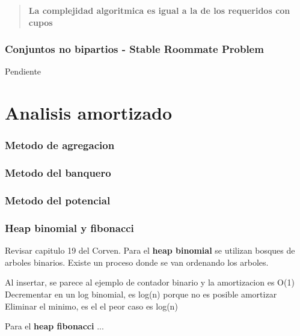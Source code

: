 \documentclass{article}
\begin{document}
\begin{quote}
    \textbf{La complejidad algoritmica es igual a la de los requeridos con cupos}
\end{quote}

\subsubsection{Conjuntos no bipartios - Stable Roommate Problem}
Pendiente

\section{Analisis amortizado}

\subsubsection{Metodo de agregacion}
\subsubsection{Metodo del banquero}
\subsubsection{Metodo del potencial}

\subsubsection{Heap binomial y fibonacci}
Revisar capitulo 19 del Corven.
\newline
Para el \textbf{heap binomial} se utilizan bosques de arboles binarios. Existe un proceso donde se van ordenando los arboles.

\newline
Al insertar, se parece al ejemplo de contador binario y la amortizacion es O(1)
\newline
Decrementar en un log binomial, es log(n) porque no es posible amortizar
\newline 
Eliminar el minimo, es el el peor caso es log(n)

Para el \textbf{heap fibonacci} ...
\end{document}
